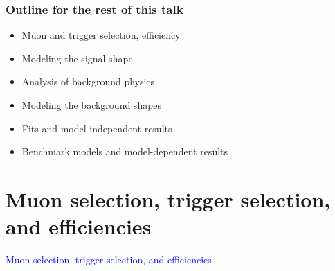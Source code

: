 \documentclass[compress]{beamer}
\begin{document}
\begin{frame}
\frametitle{Outline for the rest of this talk}
\begin{itemize}\setlength{\itemsep}{0.5 cm}
\item Muon and trigger selection, efficiency
\item Modeling the signal shape
\item Analysis of background physics
\item Modeling the background shapes
\item Fits and model-independent results
\item Benchmark models and model-dependent results
\end{itemize}
\end{frame}

\section*{Muon selection, trigger selection, and efficiencies}
\begin{frame}
\begin{center}
\Huge \textcolor{blue}{Muon selection, trigger selection, and efficiencies}
\end{center}
\end{frame}
\end{document}
